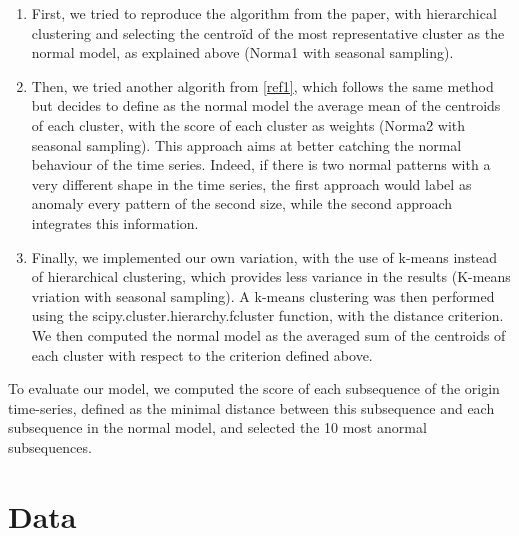\documentclass[11pt]{article}
\begin{document}
\begin{enumerate}
    \item First, we tried to reproduce the algorithm from the paper, with hierarchical clustering and selecting the centroïd of the most representative cluster as the normal model, as explained above (Norma1 with seasonal sampling).\\
    \item Then, we tried another algorith from \ref{ref1}, which follows the same method but decides to define as the normal model the average mean of the centroids of each cluster, with the score of each cluster as weights (Norma2 with seasonal sampling). 
        This approach aims at better catching the normal behaviour of the time series. 
        Indeed, if there is two normal patterns with a very different shape in the time series, the first approach would label as anomaly every pattern of the second size, while the second approach integrates this information. \\
    \item   Finally, we implemented our own variation, with the use of k-means instead of hierarchical clustering, which provides less variance in the results (K-means vriation with seasonal sampling). 
            A k-means clustering was then performed using the scipy.cluster.hierarchy.fcluster function, with the distance criterion. 
            We then computed the normal model as the averaged sum of the centroids of each cluster with respect to the criterion defined above.

\end{enumerate}




To evaluate our model, we computed the score of each subsequence of the origin time-series, defined as the minimal distance between this subsequence and each subsequence in the normal model, and selected the 10 most anormal subsequences.


\section{Data}
\end{document}
